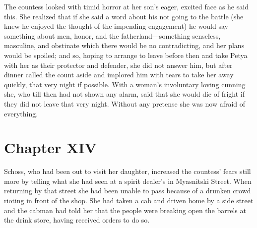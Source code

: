 The countess looked with timid horror at her son's eager, excited
face as he said this. She realized that if she said a word about
his not going to the battle (she knew he enjoyed the thought of
the impending engagement) he would say something about men,
honor, and the fatherland---something senseless, masculine, and
obstinate which there would be no contradicting, and her plans
would be spoiled; and so, hoping to arrange to leave before then
and take Petya with her as their protector and defender, she did
not answer him, but after dinner called the count aside and
implored him with tears to take her away quickly, that very night
if possible. With a woman's involuntary loving cunning she, who
till then had not shown any alarm, said that she would die of
fright if they did not leave that very night. Without any
pretense she was now afraid of everything.


\chapter*{Chapter XIV} \ifaudio {}
\fi

 Schoss, who had been out to visit her daughter, increased
the countess' fears still more by telling what she had seen at a
spirit dealer's in Myasnitski Street. When returning by that
street she had been unable to pass because of a drunken crowd
rioting in front of the shop. She had taken a cab and driven home
by a side street and the cabman had told her that the people were
breaking open the barrels at the drink store, having received
orders to do so.

